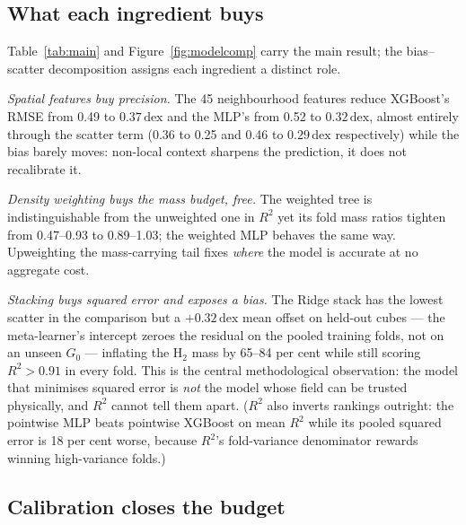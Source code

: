 \documentclass[fleqn,usenatbib]{rasti}
\newcommand{\Gzero}{G_0}
\newcommand{\dex}{\,\text{dex}}
\newcommand{\Rsq}{R^2}
\begin{document}
\subsection{What each ingredient buys}
\label{sec:main}

Table~\ref{tab:main} and Figure~\ref{fig:modelcomp} carry the main
result; the bias--scatter decomposition assigns each ingredient a
distinct role.

\emph{Spatial features buy precision.} The 45 neighbourhood features
reduce XGBoost's RMSE from 0.49 to \(0.37\dex\) and the MLP's from 0.52
to \(0.32\dex\), almost entirely through the scatter term (0.36 to 0.25
and 0.46 to \(0.29\dex\) respectively) while the bias barely moves:
non-local context sharpens the prediction, it does not recalibrate it.

\emph{Density weighting buys the mass budget, free.} The weighted tree
is indistinguishable from the unweighted one in \(\Rsq\) yet its fold
mass ratios tighten from 0.47--0.93 to 0.89--1.03; the weighted MLP
behaves the same way. Upweighting the mass-carrying tail fixes
\emph{where} the model is accurate at no aggregate cost.

\emph{Stacking buys squared error and exposes a bias.} The Ridge stack
has the lowest scatter in the comparison but a \(+0.32\dex\) mean offset
on held-out cubes --- the meta-learner's intercept zeroes the residual
on the pooled training folds, not on an unseen \(\Gzero\) --- inflating
the H\(_2\) mass by 65--84 per cent while still scoring \(\Rsq > 0.91\) in
every fold. This is the central methodological observation: the model
that minimises squared error is \emph{not} the model whose field can be
trusted physically, and \(\Rsq\) cannot tell them apart. (\(\Rsq\) also
inverts rankings outright: the pointwise MLP beats pointwise XGBoost on
mean \(\Rsq\) while its pooled squared error is 18 per cent worse,
because \(\Rsq\)'s fold-variance denominator rewards winning
high-variance folds.)

\subsection{Calibration closes the budget}
\label{sec:massbudget}
\end{document}
